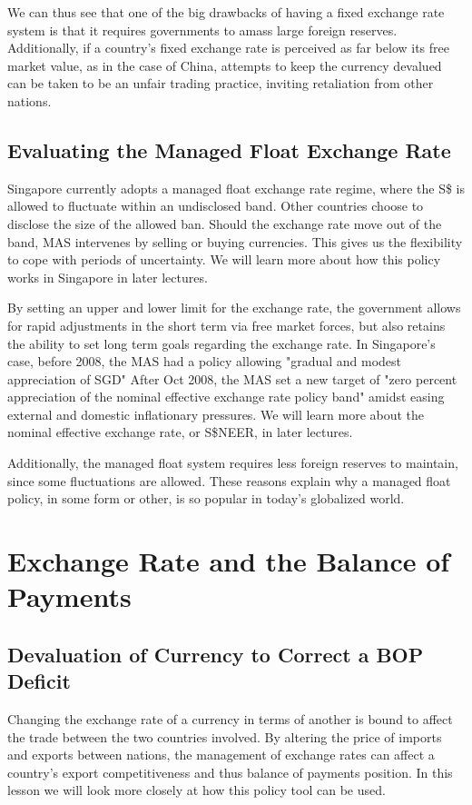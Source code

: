 We can thus see that one of the big drawbacks of having a fixed exchange rate system is that it requires governments to amass large foreign reserves. Additionally, if a country's fixed exchange rate is perceived as far below its free market value, as in the case of China, attempts to keep the currency devalued can be taken to be an unfair trading practice, inviting retaliation from other nations.
\subsection{Evaluating the Managed Float Exchange Rate}
Singapore currently adopts a managed float exchange rate regime, where the S\$ is allowed to fluctuate within an undisclosed band. Other countries choose to disclose the size of the allowed ban. Should the exchange rate move out of the band, MAS intervenes by selling or buying currencies. This gives us the flexibility to cope with periods of uncertainty. We will learn more about how this policy works in Singapore in later lectures.

By setting an upper and lower limit for the exchange rate, the government allows for rapid adjustments in the short term via free market forces, but also retains the ability to set long term goals regarding the exchange rate. In Singapore's case, before 2008, the MAS had a policy allowing "gradual and modest appreciation of SGD" After Oct 2008, the MAS set a new target of "zero percent appreciation of the nominal effective exchange rate policy band" amidst easing external and domestic inflationary pressures. We will learn more about the nominal effective exchange rate, or S\$NEER, in later lectures.

Additionally, the managed float system requires less foreign reserves to maintain, since some fluctuations are allowed. These reasons explain why a managed float policy, in some form or other, is so popular in today's globalized world.
\section{Exchange Rate and the Balance of Payments}
\subsection{Devaluation of Currency to Correct a BOP Deficit}
Changing the exchange rate of a currency in terms of another is bound to affect the trade between the two countries involved. By altering the price of imports and exports between nations, the management of exchange rates can affect a country's export competitiveness and thus balance of payments position. In this lesson we will look more closely at how this policy tool can be used.

